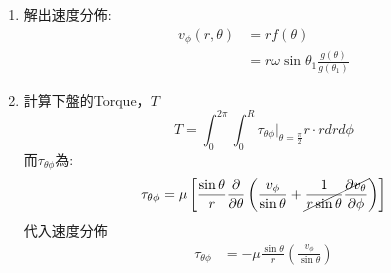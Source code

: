 \documentclass[../main.tex]{subfiles}
\begin{document}
\begin{itemize}
\begin{enumerate}
\begin{itemize}
\begin{equation}
        \left[
          -\frac{1}{2}\frac{\cos\theta}{\sin\theta} - \frac{1}{2}\sin\theta \ln\left|\frac{1+\cos\theta}{\sin\theta}\right|
        \right]
      \end{equation}
      令$g(\theta)$為:
      \begin{align}
        g(\theta) &= \frac{\cos\theta}{\sin\theta} +\sin\theta \ln\left|\frac{1+\cos\theta}{\sin\theta}\right| \nonumber\\
        &= \cot\theta + \sin\theta \ln\left|\tan\left(\frac{\theta}{2}\right)\right| \nonumber\\
        &= \cot\theta + \frac{1}{2}\sin\theta \ln\left|\tan^2\left(
          \frac{\theta}{2}
        \right)\right| \nonumber\\
        &= \cot\theta + \frac{1}{2}\sin\theta \ln\left|\frac{1-\cos\theta}{1+\cos\theta}\right|
      \end{align}
      則$f(\theta)$可改寫為:
      \begin{align}
        f(\theta) &= \omega \sin\theta_1 \cdot\frac{1}{
          -\frac{1}{2}g(\theta_1)} \cdot
        \left[
          -\frac{1}{2}g(\theta)
        \right] \nonumber\\
        &= \omega \sin\theta_1 \frac{g(\theta)}{g(\theta_1)}
      \end{align}
    \end{itemize}
    \item 解出速度分佈:
    \begin{align}
      v_\phi (r,\theta) &= r f(\theta) \nonumber\\
      &= r \omega \sin\theta_1 \frac{g(\theta)}{g(\theta_1)}
    \end{align}
    \item 計算下盤的Torque，$T$
    \begin{equation}
      T = \int_0^{2\pi} \int_0^R \tau_{\theta\phi}\big|_{\theta=\frac{\pi}{2}} r \cdot r dr d\phi \label{eq:ch2_3_cone_plate_torque}
    \end{equation}
    而$\tau_{\theta\phi}$為:
    \begin{equation}
      \tau_{\theta\phi} = \mu \left[
        \frac{\sin\theta}{r}\frac{\partial}{\partial \theta}\left(
          \frac{v_\phi}{\sin\theta} + \cancel{\frac{1}{r\sin\theta}\frac{\partial v_\theta}{\partial \phi}}
        \right)
      \right] 
    \end{equation}
    代入速度分佈
    \begin{align}
      \tau_{\theta\phi} &= -\mu\frac{\sin\theta}{r}\left(\frac{v_\phi}{\sin\theta}\right) \nonumber\\

\end{align}
\end{enumerate}
\end{itemize}
\end{document}
